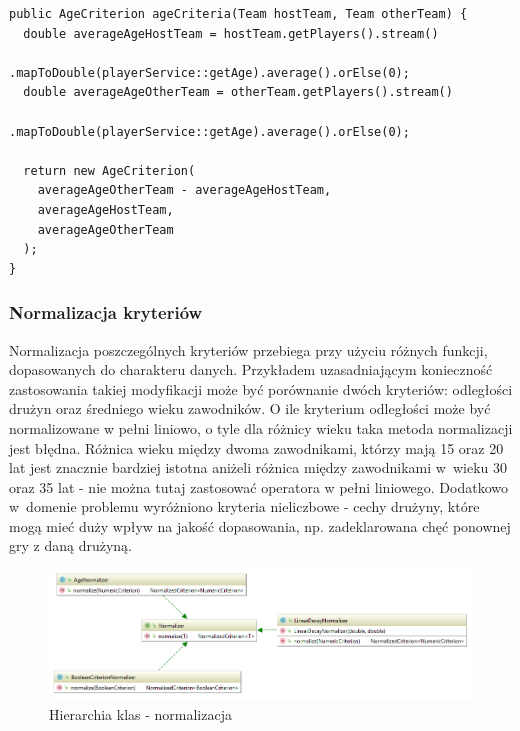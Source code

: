 \begin{minipage}{\linewidth}
\begin{lstlisting}[label=list:age-crit-gen, caption=Generacja kryterium różnicy wieku między dwoma drużynami, basicstyle=\footnotesize\ttfamily]
public AgeCriterion ageCriteria(Team hostTeam, Team otherTeam) {
  double averageAgeHostTeam = hostTeam.getPlayers().stream()
                .mapToDouble(playerService::getAge).average().orElse(0);
  double averageAgeOtherTeam = otherTeam.getPlayers().stream()
                .mapToDouble(playerService::getAge).average().orElse(0);

  return new AgeCriterion(
    averageAgeOtherTeam - averageAgeHostTeam, 
    averageAgeHostTeam, 
    averageAgeOtherTeam
  );
}
\end{lstlisting}
\end{minipage}

\subsubsection{Normalizacja kryteriów}

 Normalizacja poszczególnych kryteriów przebiega przy użyciu różnych funkcji, dopasowanych do charakteru danych. Przykładem uzasadniającym konieczność zastosowania takiej modyfikacji może być porównanie dwóch kryteriów: odległości drużyn oraz średniego wieku zawodników. O ile kryterium odległości może być normalizowane w pełni liniowo, o tyle dla różnicy wieku taka metoda normalizacji jest błędna. Różnica wieku między dwoma zawodnikami, którzy mają 15 oraz 20 lat jest znacznie bardziej istotna aniżeli różnica między zawodnikami w~wieku 30 oraz 35 lat - nie można tutaj zastosować operatora w pełni liniowego. Dodatkowo w~domenie problemu wyróżniono kryteria nieliczbowe - cechy drużyny, które mogą mieć duży wpływ na jakość dopasowania, np. zadeklarowana chęć ponownej gry z daną drużyną.  
 

 
\begin{figure}[H]
\centering
\includegraphics[width=\linewidth]{06-implementacja/rys/normalizer-hierarchy.PNG}
\caption{Hierarchia klas - normalizacja}
\label{fig:criterion-classes}
\end{figure}

